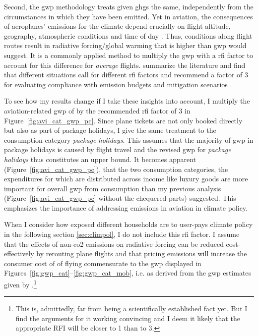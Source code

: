 \documentclass[referee, lineno, pdflatex,sn-apa]{sn-jnl}%
\theoremstyle{thmstyleone}%
\theoremstyle{thmstyletwo}%
\theoremstyle{thmstylethree}%
\begin{document}
Second, the \ac{gwp} methodology treats given \acp{ghg} the same, independently from the circumstances in which they have been emitted.
Yet in aviation, the consequences of aeroplanes' emissions for the climate depend crucially on flight altitude, geography, atmospheric conditions and time of day \citep{fromming_influence_2021}.
Thus, conditions along flight routes result in radiative forcing/global warming that is higher than \ac{gwp} would suggest.
It is a commonly applied method to multiply the \ac{gwp} with a \ac{rfi} factor to account
 for this difference for \emph{average} flights.
\citet{neu_impact_2021}
summarize the literature and find that different situations call for different \ac{rfi} factors and recommend a factor of 3 for evaluating compliance with emission budgets and mitigation scenarios \citep[see also ][]{lee_contribution_2021}.

To see how my results change if I take these insights into account, I multiply the aviation-related \ac{gwp} of \citet{jakobs_nfp73_2023} by the recommended \ac{rfi} factor of 3 in Figure~\ref{fig:avi_cat_gwp_pc}.
Since plane tickets are not only booked directly but also as part of package holidays, I give the same treatment to the consumption category \emph{package holidays}.
This assumes that the majority of \ac{gwp} in package holidays is caused by flight travel and the revised \ac{gwp} for \emph{package holidays} thus constitutes an upper bound.
It becomes apparent (Figure~\ref{fig:avi_cat_gwp_pc}), that the two consumption categories, the expenditures for which are distributed across income like luxury goods are more important for overall \ac{gwp} from consumption than my previous analysis (Figure~\ref{fig:avi_cat_gwp_pc} without the chequered parts) suggested.
This emphasizes the importance of addressing emissions in aviation in climate policy.

When I consider how exposed different households are to user-pays climate policy in the following section \ref{sec:climpol}, I do not include this \ac{rfi} factor.
I assume that the effects of non-\ac{co2} emissions on radiative forcing can be reduced cost-effectively by rerouting plane flights and that pricing emissions will increase the consumer cost of of flying commensurate to the \ac{gwp} displayed in Figures~\ref{fig:gwp_cat}--\ref{fig:gwp_cat_mob}, i.e. as derived from the \ac{gwp} estimates given by \citet{jakobs_nfp73_2023}.\footnote{%
  This is, admittedly, far from being a scientifically established fact yet.
  But I find the arguments for it working convincing and I deem it likely that the appropriate RFI will be closer to 1 than to 3.
}
\end{document}
